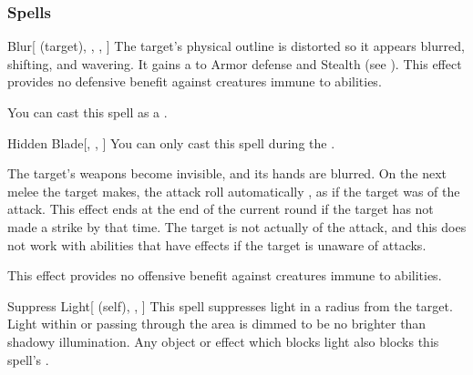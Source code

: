 \subsubsection{Spells}


\lowercase{\hypertarget{spell:Blur}{}}\label{spell:Blur}
\begin{attuneability}[\nth{1}]{\hypertarget{spell:Blur}{Blur}}[ (target), , , ]
The target's physical outline is distorted so it appears blurred, shifting, and wavering.
It gains a   to Armor defense and Stealth (see ).
This effect provides no defensive benefit against creatures immune to  abilities.

You can cast this spell as a .
\end{attuneability}
\vspace{0.25em}



\lowercase{\hypertarget{spell:Hidden Blade}{}}\label{spell:Hidden Blade}
\begin{freeability}[\nth{1}]{\hypertarget{spell:Hidden Blade}{Hidden Blade}}[, , ]
You can only cast this spell during the .

The target's weapons become invisible, and its hands are blurred.
On the next melee  the target makes,
the attack roll automatically ,
as if the target was  of the attack.
This effect ends at the end of the current round if the target has not made a strike by that time.
The target is not actually  of the attack, and this does not work with abilities that have effects if the target is unaware of attacks.

This effect provides no offensive benefit against creatures immune to  abilities.
\end{freeability}
\vspace{0.25em}



\lowercase{\hypertarget{spell:Suppress Light}{}}\label{spell:Suppress Light}
\begin{attuneability}[\nth{1}]{\hypertarget{spell:Suppress Light}{Suppress Light}}[ (self), , ]
This spell suppresses light in a \areamed radius  from the target.
Light within or passing through the area is dimmed to be no brighter than shadowy illumination.
Any object or effect which blocks light also blocks this spell's .
\end{attuneability}
\vspace{0.25em}



